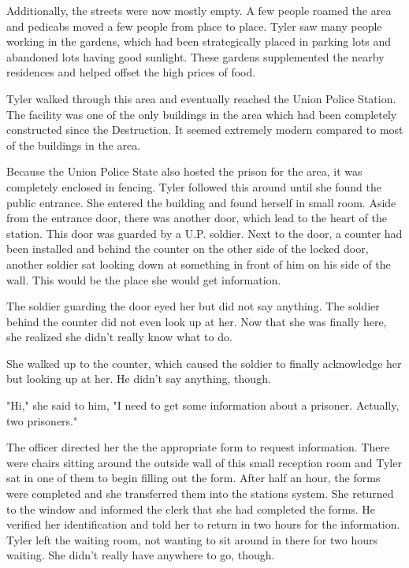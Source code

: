 \documentclass[courier]{sffms}
\begin{document}
Additionally, the streets were now mostly empty.
A few people roamed the area and pedicabs moved a
few people from place to place. Tyler saw many people
working in the gardens, which had been strategically
placed in parking lots and abandoned lots having
good sunlight. These gardens supplemented the
nearby residences and helped offset the high prices
of food.

Tyler walked through this area and eventually reached
the Union Police Station. The facility was one of the
only buildings in the area which had been completely
constructed since the Destruction. It seemed extremely
modern compared to most of the buildings in the area.

Because the Union Police State also hosted the prison
for the area, it was completely enclosed in fencing. Tyler
followed this around until she found the public entrance.
She entered the building and found herself in small room.
Aside from the entrance door, there was another door,
which lead to the heart of the station. This door was
guarded by a U.P. soldier. Next to the door, a counter had
been installed and behind the counter on the other side
of the locked door, another soldier sat looking down
at something in front of him on his side of the wall. This
would be the place she would get information.

The soldier guarding the door eyed her but did not say
anything. The soldier behind the counter did not even
look up at her. Now that she was finally here, she realized
she didn't really know what to do.

She walked up to the counter, which caused the soldier
to finally acknowledge her but looking up at her. He
didn't say anything, though.

"Hi," she said to him, "I need to get some information
about a prisoner. Actually, two prisoners."

The officer directed her the the appropriate form to
request information. There were chairs sitting around the
outside wall of this small reception room and Tyler sat in
one of them to begin filling out the form. After half an
hour, the forms were completed and she transferred them
into the stations system. She returned to the window and
informed the clerk that she had completed the forms. He
verified her identification and told her to return in two
hours for the information. Tyler left the waiting room,
not wanting to sit around in
there for two hours waiting. She didn't really have anywhere
to go, though.
\end{document}

